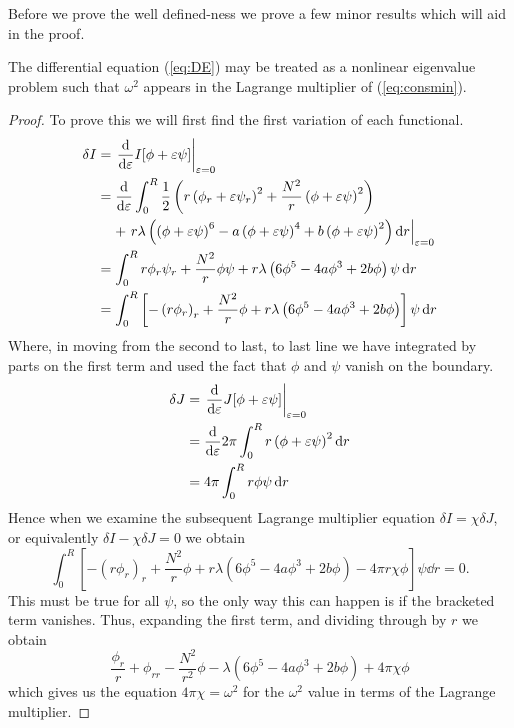 Before we prove the well defined-ness we prove a few minor results which will
aid in the proof.
\begin{lemma}\label{lem:nonlineig}
    The differential equation (\ref{eq:DE}) may be treated as a nonlinear
    eigenvalue problem such that \(\omega^2\) appears in the Lagrange multiplier
    of (\ref{eq:consmin}). 
\end{lemma}
\begin{proof}
    To prove this we will first find the first variation of each functional.
    \begin{align}
        \delta I & = \left.\dv{\varepsilon}I[\phi + \varepsilon\psi]\right|_{\varepsilon = 0} \nonumber\\
                 & = \dv{\varepsilon}\int_0^R \frac{1}{2}\left(r\left(\phi_r + \varepsilon\psi_r\right)^2 + \frac{N^2}{r}\left(\phi + \varepsilon\psi\right)^2\right) \nonumber\\
                 & \phantom{=}\,\,+ \left.r\lambda\left(\left(\phi + \varepsilon\psi\right)^6 - a\left(\phi + \varepsilon\psi\right)^4 + b\left(\phi + \varepsilon\psi\right)^2\right)\dd{r}\right|_{\varepsilon = 0} \nonumber\\
                 & = \int_0^R r\phi_r\psi_r + \frac{N^2}{r}\phi\psi + r\lambda\left(6\phi^5 - 4a\phi^3 + 2b\phi\right)\psi\dd{r} \nonumber\\
                 & = \int_0^R\left[-\left(r\phi_r\right)_r + \frac{N^2}{r}\phi + r\lambda\left(6\phi^5 - 4a\phi^3 + 2b\phi\right)\right]\psi\dd{r}
    \end{align}
    Where, in moving from the second to last, to last line we have integrated by
    parts on the first term and used the fact that \(\phi\) and \(\psi\) vanish
    on the boundary.
    \begin{align}
        \delta J & = \left.\dv{\varepsilon}J[\phi + \varepsilon\psi]\right|_{\varepsilon = 0} \nonumber \\
                 & = \dv{\varepsilon}2\pi\int_0^R r\left(\phi + \varepsilon\psi\right)^2\dd{r} \nonumber \\
                 & = 4\pi\int_0^R r\phi\psi\dd{r}
    \end{align}
    Hence when we examine the subsequent Lagrange multiplier equation \(\delta I = \chi\delta J\), or equivalently \(\delta I - \chi\delta J = 0\) we obtain
    \begin{equation}
        \int_0^R\left[-\left(r\phi_r\right)_r + \frac{N^2}{r}\phi + r\lambda\left(6\phi^5 - 4a\phi^3 + 2b\phi\right) - 4\pi r\chi \phi\right]\psi\dd{r} = 0.
    \end{equation}
    This must be true for all \(\psi\), so the only way this can happen is if the bracketed term vanishes. Thus, expanding the first term, and dividing through by \(r\) we obtain
    \begin{equation}
        \frac{\phi_r}{r} + \phi_{rr} - \frac{N^2}{r^2}\phi - \lambda\left(6\phi^5 - 4a\phi^3 + 2b\phi\right) + 4\pi\chi \phi
    \end{equation}
    which gives us the equation \(4\pi\chi = \omega^2\) for the \(\omega^2\) value in terms of the Lagrange multiplier.
\end{proof}

